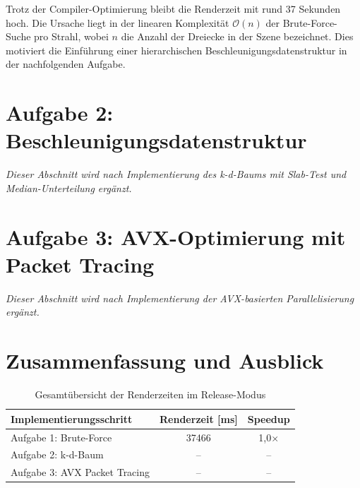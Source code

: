 \documentclass[11pt, a4paper]{article}
\begin{document}
Trotz der Compiler-Optimierung bleibt die Renderzeit mit rund 37 Sekunden hoch. Die Ursache liegt in der linearen Komplexität $\mathcal{O}(n)$ der Brute-Force-Suche pro Strahl, wobei $n$ die Anzahl der Dreiecke in der Szene bezeichnet. Dies motiviert die Einführung einer hierarchischen Beschleunigungsdatenstruktur in der nachfolgenden Aufgabe.

\section{Aufgabe 2: Beschleunigungsdatenstruktur}

\textit{Dieser Abschnitt wird nach Implementierung des k-d-Baums mit Slab-Test und Median-Unter\-teilung ergänzt.}

\section{Aufgabe 3: AVX-Optimierung mit Packet Tracing}

\textit{Dieser Abschnitt wird nach Implementierung der AVX-basierten Parallelisierung ergänzt.}

\section{Zusammenfassung und Ausblick}

\begin{table}[H]
    \centering
    \caption{Gesamtübersicht der Renderzeiten im Release-Modus}
    \label{tab:zeiten-gesamt}
    \begin{tabular}{l S[table-format=6.0] S[table-format=3.1]}
        \toprule
        \textbf{Implementierungsschritt} & {\textbf{Renderzeit [ms]}} & {\textbf{Speedup}} \\
        \midrule
        Aufgabe 1: Brute-Force           & 37466  & {1,0$\times$} \\
        Aufgabe 2: k-d-Baum              & {--}   & {--} \\
        Aufgabe 3: AVX Packet Tracing    & {--}   & {--} \\
        \bottomrule
    \end{tabular}
\end{table}
\end{document}
